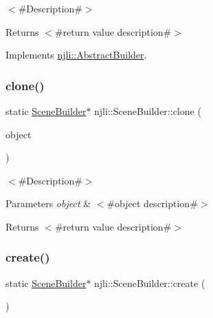 $<$\#\+Description\#$>$

\begin{DoxyReturn}{Returns}
$<$\#return value description\#$>$ 
\end{DoxyReturn}


Implements \mbox{\hyperlink{classnjli_1_1_abstract_builder_aa1d220053e182c37b31b427499c6eacf}{njli\+::\+Abstract\+Builder}}.

\mbox{\label{classnjli_1_1_scene_builder_ada4fdb5701ec3f8167c7c27d0e26828c}} 
\subsubsection{\texorpdfstring{clone()}{clone()}}
{\footnotesize\ttfamily static \mbox{\hyperlink{classnjli_1_1_scene_builder}{Scene\+Builder}}$\ast$ njli\+::\+Scene\+Builder\+::clone (\begin{DoxyParamCaption}\item[{const \mbox{\hyperlink{classnjli_1_1_scene_builder}{Scene\+Builder}} \&}]{object }\end{DoxyParamCaption})\hspace{0.3cm}{\ttfamily [static]}}

$<$\#\+Description\#$>$


\begin{DoxyParams}{Parameters}
{\em object} & $<$\#object description\#$>$\\
\hline
\end{DoxyParams}
\begin{DoxyReturn}{Returns}
$<$\#return value description\#$>$ 
\end{DoxyReturn}
\mbox{\label{classnjli_1_1_scene_builder_aa4f2fe2401942a03809494d03a9f76d7}} 
\subsubsection{\texorpdfstring{create()}{create()}}
{\footnotesize\ttfamily static \mbox{\hyperlink{classnjli_1_1_scene_builder}{Scene\+Builder}}$\ast$ njli\+::\+Scene\+Builder\+::create (\begin{DoxyParamCaption}{ }\end{DoxyParamCaption})\hspace{0.3cm}{\ttfamily [static]}}

